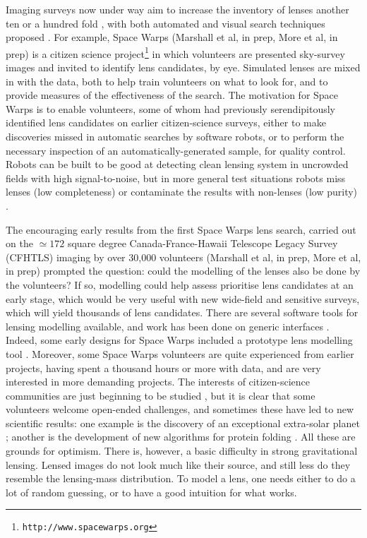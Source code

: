 \documentclass[usenatbib]{mn2e}
\newcommand{\sw}{Space Warps\xspace}
\begin{document}
Imaging surveys now under way aim to increase the inventory of lenses
another ten or a hundred fold \citep[see
e.g.][]{Marshall2005,OguriMarshall2010}, with both automated and
visual search techniques proposed
\citep[e.g.][]{Marshall2009,More2012ApJ,Gavazzi2014}. For example, \sw
(Marshall et al, in prep, More et al, in prep) is a citizen science
project\footnote{\tt http://www.spacewarps.org} in which volunteers
are presented sky-survey images and invited to identify lens
candidates, by eye.  Simulated lenses are mixed in with the data,
both to help train volunteers on what to look for, and to provide
measures of the effectiveness of the search.  The motivation for \sw
is to enable volunteers, some of whom had previously serendipitously
identified lens candidates on earlier citizen-science surveys,
either to make discoveries missed in automatic searches by
software robots, or to perform the necessary inspection of an
automatically-generated sample, for quality control.  Robots can be
built to be good at detecting clean lensing system in uncrowded fields
with high signal-to-noise, but in more general test situations robots
miss lenses (low completeness) or contaminate the results with
non-lenses (low purity) \citep{Marshall2009}. 

The encouraging early results from the first \sw lens search,
carried out on the  $\simeq172$ square degree Canada-France-Hawaii
Telescope Legacy Survey (CFHTLS) imaging by over 30,000 volunteers
(Marshall et al, in prep, More et al, in prep) prompted the question:
could the modelling of the lenses also be done by the volunteers?  If
so, modelling could help assess prioritise lens candidates at an early
stage, which would be very useful with new wide-field and sensitive
surveys, which will yield thousands of lens candidates. There are
several software tools for lensing modelling available, and work has
been done on generic interfaces \citep[e.g.][]{2014A&C.....5...28L}. 
Indeed, some early designs for \sw included a prototype lens modelling
tool \citep{2010AAS...21543527N}. Moreover, some \sw volunteers are
quite experienced from earlier projects, having spent a thousand hours
or more with data, and are very interested in more demanding
projects.  The interests of citizen-science communities are just
beginning to be studied \citep[e.g.,][]{2013AEdRv..12a0106J}, but it
is clear that some volunteers welcome open-ended challenges, and
sometimes these have led to new scientific results: one example is the
discovery of an exceptional extra-solar planet
\citep{2013ApJ...768..127S}; another is the development of new
algorithms for protein folding \citep{Khatib22112011}.  All these are
grounds for optimism.  There is, however, a basic difficulty in strong
gravitational lensing. Lensed images do not look much like their
source, and still less do they resemble the lensing-mass
distribution.  To model a lens, one needs either to do a lot of random
guessing, or to have a good intuition for what works.
\end{document}
